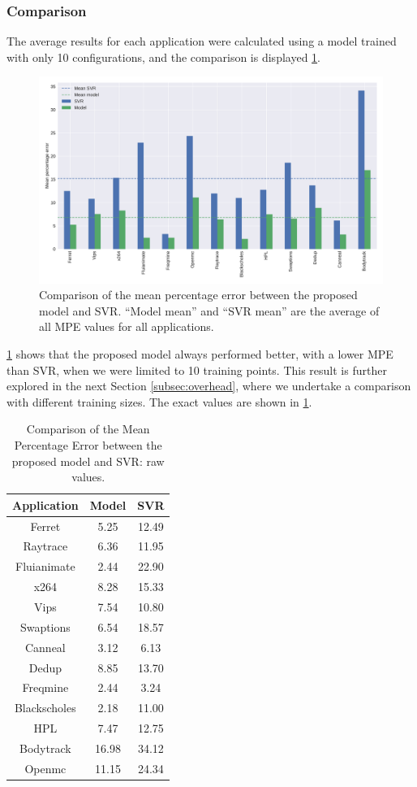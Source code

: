 \subsubsection{Comparison}
The average results for each application were calculated using a model trained with only 10 configurations, and the comparison is displayed \cref{fig:mpe_svr_eq}. %
\begin{figure}[H]
	\centering
	\includegraphics[width=.8\columnwidth]{models/figures/mpe_svr_eq.pdf}
	\caption{Comparison of the mean percentage error between the proposed model and SVR. ``Model mean'' and ``SVR mean'' are the average of all MPE values for all applications.
	}
	\label{fig:mpe_svr_eq}
\end{figure}

\cref{fig:mpe_svr_eq} shows that the proposed model always performed better, with a lower MPE than SVR, when we were limited to 10 training points. This result is further explored in the next Section \ref{subsec:overhead}, where we undertake a comparison with different training sizes. The exact values are shown in \cref{tab:mpe_svr_eq}.

\begin{table}[H]
\centering
\begin{tabular}{c|c|c}
\hline
Application  & Model & SVR   \\ \hline
Ferret       & 5.25     & 12.49  \\ 
Raytrace     & 6.36     & 11.95  \\
Fluianimate  & 2.44     & 22.90  \\
x264         & 8.28     & 15.33  \\
Vips         & 7.54     & 10.80  \\
Swaptions    & 6.54     & 18.57  \\
Canneal      & 3.12     & 6.13   \\
Dedup        & 8.85     & 13.70  \\
Freqmine     & 2.44     & 3.24   \\
Blackscholes & 2.18     & 11.00  \\
HPL          & 7.47     & 12.75  \\
Bodytrack    & 16.98    & 34.12  \\
Openmc       & 11.15    & 24.34  \\
\end{tabular}
\caption{Comparison of the Mean Percentage Error between the proposed model and SVR: raw values.}
\label{tab:mpe_svr_eq}
\end{table}

